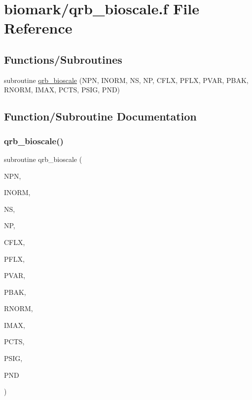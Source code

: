 \hypertarget{qrb__bioscale_8f}{}\section{biomark/qrb\+\_\+bioscale.f File Reference}
\label{qrb__bioscale_8f}
\subsection*{Functions/\+Subroutines}
\begin{DoxyCompactItemize}
\item 
subroutine \hyperlink{qrb__bioscale_8f_a977412b84b2a89b895fad99be2c2e65c}{qrb\+\_\+bioscale} (N\+PN, I\+N\+O\+RM, NS, NP, C\+F\+LX, P\+F\+LX, P\+V\+AR, P\+B\+AK, R\+N\+O\+RM, I\+M\+AX, P\+C\+TS, P\+S\+IG, P\+ND)
\end{DoxyCompactItemize}


\subsection{Function/\+Subroutine Documentation}
\mbox{\label{qrb__bioscale_8f_a977412b84b2a89b895fad99be2c2e65c}} 
\subsubsection{\texorpdfstring{qrb\+\_\+bioscale()}{qrb\_bioscale()}}
{\footnotesize\ttfamily subroutine qrb\+\_\+bioscale (\begin{DoxyParamCaption}\item[{integer}]{N\+PN,  }\item[{integer, dimension(npn)}]{I\+N\+O\+RM,  }\item[{integer}]{NS,  }\item[{integer}]{NP,  }\item[{double precision, dimension(np)}]{C\+F\+LX,  }\item[{double precision, dimension(np,ns)}]{P\+F\+LX,  }\item[{double precision, dimension(np,ns)}]{P\+V\+AR,  }\item[{double precision, dimension(np,ns)}]{P\+B\+AK,  }\item[{double precision, dimension(ns)}]{R\+N\+O\+RM,  }\item[{integer, dimension(np)}]{I\+M\+AX,  }\item[{double precision, dimension(np)}]{P\+C\+TS,  }\item[{double precision, dimension(np)}]{P\+S\+IG,  }\item[{double precision, dimension(np,ns)}]{P\+ND }\end{DoxyParamCaption})}

